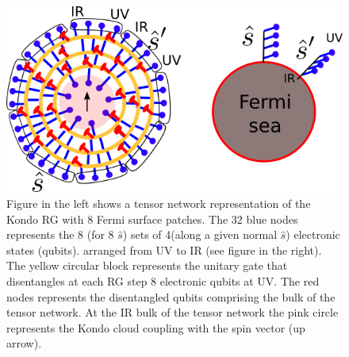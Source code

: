 \documentclass[aps,prx,preprint,groupedaddress]{revtex4-2}
\begin{document}
\begin{figure}
\includegraphics[scale=1]{TNKondo.png}
\caption{Figure in the left shows a tensor network representation of the Kondo RG with  8 Fermi surface patches. The 32 blue nodes represents the 8 (for 8 $\hat{s}$) sets of 4(along a given normal $\hat{s}$) electronic states (qubits).  arranged from UV to IR (see figure in the right). The yellow circular block represents the unitary gate that disentangles at each RG step 8 electronic qubits at UV. The red nodes represents the disentangled qubits comprising the bulk of the tensor network. At the IR bulk of the tensor network the pink circle represents the Kondo cloud coupling with the spin vector (up arrow).} \label{KondoTN}
\end{figure}
\end{document}
